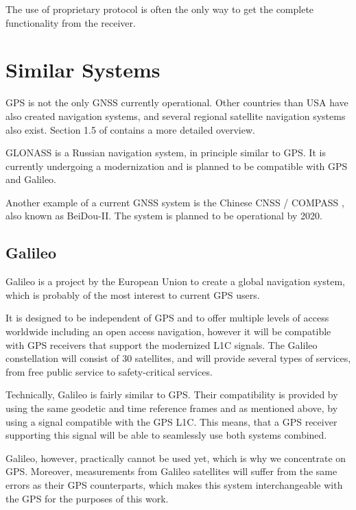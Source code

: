 The use of proprietary protocol is often the only way to get the complete functionality from
the receiver.

\section{Similar Systems}
\label{sec:gps-alternatives}

GPS is not the only GNSS currently operational.
Other countries than USA have also created navigation systems, and several regional satellite
navigation systems also exist.
Section 1.5 of \cite{david} contains a more detailed overview.

GLONASS \cite{glonass} is a Russian navigation system, in principle similar to GPS.
It is currently undergoing a modernization and is planned to be compatible with GPS and Galileo.

Another example of a current GNSS system is the Chinese CNSS / COMPASS \cite{compass},
also known as  BeiDou-II.
The system is planned to be operational by 2020.

\subsection{Galileo}
\label{sec:galileo}

Galileo \cite{galileo} is a project by the European Union to create a global navigation system, which
is probably of the most interest to current GPS users.

It is designed to be independent of GPS and to offer multiple levels of access worldwide
including an open access navigation, however
it will be compatible with GPS receivers that support the modernized L1C signals.
The Galileo constellation will consist of 30 satellites, and will provide several types of services,
from free public service to safety-critical services.

Technically, Galileo is fairly similar to GPS.
Their compatibility is provided by using the same geodetic and time reference frames
and as mentioned above, by using a signal compatible with the GPS L1C.
This means, that a GPS receiver supporting this signal will be able to seamlessly
use both systems combined.

Galileo, however, practically cannot be used yet, which is why we concentrate on GPS.
Moreover, measurements from Galileo satellites will suffer from the same errors as
their GPS counterparts, which makes this system interchangeable with the GPS for the purposes
of this work.
